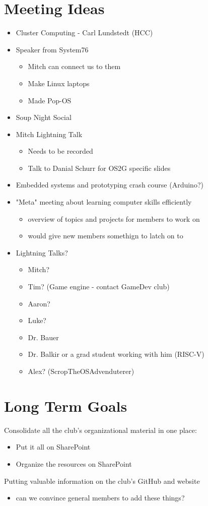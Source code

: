 \section{Meeting Ideas}
\begin{itemize}
    \item Cluster Computing - Carl Lundstedt (HCC)
    \item Speaker from System76
    \begin{itemize}
        \item Mitch can connect us to them
        \item Make Linux laptops
        \item Made Pop-OS
    \end{itemize}
    \item Soup Night Social
    \item Mitch Lightning Talk
    \begin{itemize}
        \item Needs to be recorded
        \item Talk to Danial Schurr for OS2G specific slides
    \end{itemize}
    \item Embedded systems and prototyping crash course (Arduino?)
    \item "Meta" meeting about learning computer skills efficiently
    \begin{itemize}
        \item overview of topics and projects for members to work on
        \item would give new members somethign to latch on to
    \end{itemize}
    \item Lightning Talks?
    \begin{itemize}
        \item Mitch?
        \item Tim? (Game engine - contact GameDev club)
        \item Aaron?
        \item Luke?
        \item Dr. Bauer
        \item Dr. Balkir or a grad student working with him (RISC-V)
        \item Alex? (ScropTheOSAdvenduterer)
    \end{itemize}
\end{itemize}

\section{Long Term Goals}
Consolidate all the club's organizational material in one place:
\begin{itemize}
    \item Put it all on SharePoint
    \item Organize the resources on SharePoint
\end{itemize}
Putting valuable information on the club's GitHub and website 
\begin{itemize}
    \item can we convince general members to add these things?
\end{itemize}

